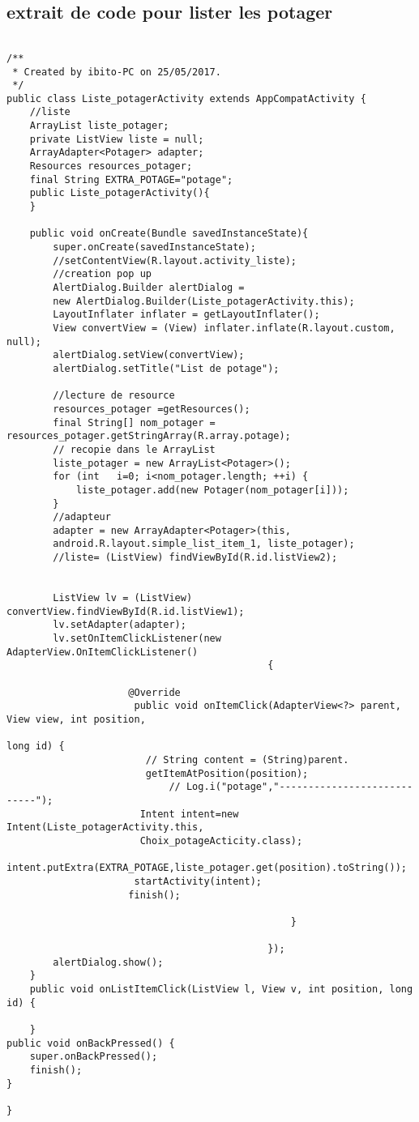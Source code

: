 \subsection{extrait de code pour lister les potager}
\begin{lstlisting}

/**
 * Created by ibito-PC on 25/05/2017.
 */
public class Liste_potagerActivity extends AppCompatActivity {
    //liste
    ArrayList liste_potager;
    private ListView liste = null;
    ArrayAdapter<Potager> adapter;
    Resources resources_potager;
    final String EXTRA_POTAGE="potage";
    public Liste_potagerActivity(){
    }

    public void onCreate(Bundle savedInstanceState){
        super.onCreate(savedInstanceState);
        //setContentView(R.layout.activity_liste);
        //creation pop up
        AlertDialog.Builder alertDialog = 
        new AlertDialog.Builder(Liste_potagerActivity.this);
        LayoutInflater inflater = getLayoutInflater();
        View convertView = (View) inflater.inflate(R.layout.custom, null);
        alertDialog.setView(convertView);
        alertDialog.setTitle("List de potage");

        //lecture de resource
        resources_potager =getResources();
        final String[] nom_potager = resources_potager.getStringArray(R.array.potage);
        // recopie dans le ArrayList
        liste_potager = new ArrayList<Potager>();
        for (int   i=0; i<nom_potager.length; ++i) {
            liste_potager.add(new Potager(nom_potager[i]));
        }
        //adapteur
        adapter = new ArrayAdapter<Potager>(this,
        android.R.layout.simple_list_item_1, liste_potager);
        //liste= (ListView) findViewById(R.id.listView2);


        ListView lv = (ListView) convertView.findViewById(R.id.listView1);
        lv.setAdapter(adapter);
        lv.setOnItemClickListener(new AdapterView.OnItemClickListener()
                                             {

                     @Override
                      public void onItemClick(AdapterView<?> parent, View view, int position,
                                                                         long id) {
                        // String content = (String)parent.
                        getItemAtPosition(position);
                            // Log.i("potage","----------------------------");
                       Intent intent=new Intent(Liste_potagerActivity.this,
                       Choix_potageActicity.class);
                      intent.putExtra(EXTRA_POTAGE,liste_potager.get(position).toString());
                      startActivity(intent);
                     finish();

                                                 }

                                             });
        alertDialog.show();
    }
    public void onListItemClick(ListView l, View v, int position, long id) {

    }
public void onBackPressed() {
    super.onBackPressed();  
    finish();
}

}
\end{lstlisting}
